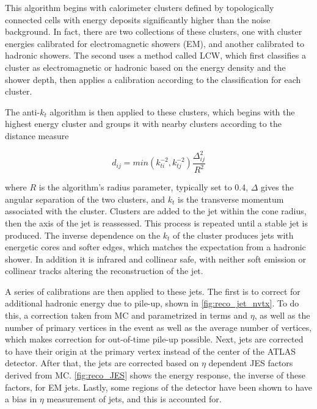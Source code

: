 This algorithm begins with calorimeter clusters defined by topologically connected cells with energy deposits significantly higher than the noise background. In fact, there are two collections of these clusters, one with cluster energies calibrated for electromagnetic showers (\acs{EM}), and another calibrated to hadronic showers. The second uses a method called \ac{LCW}, which first classifies a cluster as electromagnetic or hadronic based on the energy density and the shower depth, then applies a calibration according to the classification for each cluster.

The anti-$k_t$ algorithm is then applied to these clusters, which begins with the highest energy cluster and groups it with nearby clusters according to the distance measure

\begin{equation}
d_{ij} = min(k^{-2}_{ti}, k^{-2}_{tj}) \frac{\Delta_{ij}^2}{R^2}
\end{equation}

where $R$ is the algorithm's radius parameter, typically set to 0.4, $\Delta$ gives the angular separation of the two clusters, and $k_t$ is the transverse momentum associated with the cluster. Clusters are added to the jet within the cone radius, then the axis of the jet is reassessed. This process is repeated until a stable jet is produced. The inverse dependence on the $k_t$ of the cluster produces jets with energetic cores and softer edges, which matches the expectation from a hadronic shower. In addition it is infrared and collinear safe, with neither soft emission or collinear tracks altering the reconstruction of the jet. 

A series of calibrations are then applied to these jets. The first is to correct for additional hadronic energy due to pile-up, shown in \autoref{fig:reco_jet_nvtx}. To do this, a correction taken from \ac{MC} and parametrized in terms \pt and $\eta$, as well as the number of primary vertices in the event as well as the average number of vertices, which makes correction for out-of-time pile-up possible. Next, jets are corrected to have their origin at the primary vertex instead of the center of the ATLAS detector. After that, the jets are corrected based on $\eta$ dependent \acf{JES} factors derived from \ac{MC}. \autoref{fig:reco_JES} shows the energy response, the inverse of these factors, for \ac{EM} jets. Lastly, some regions of the detector have been shown to have a bias in $\eta$ measurement of jets, and this is accounted for. 

